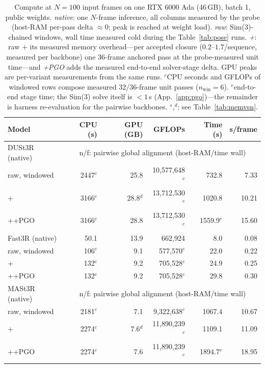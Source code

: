 \begin{table}[h]
\centering\scriptsize
\setlength{\tabcolsep}{3.5pt}
\caption{Compute at $N{=}100$ input frames on one RTX 6000 Ada (46\,GB),
batch 1, public weights. \emph{native}: one $N$-frame inference, all
columns measured by the probe (host-RAM per-pass delta ${\approx}0$;
peak is reached at weight load). \emph{raw}: Sim(3)-chained windows,
wall time measured cold during the Table~\ref{tab:pose} runs.
\emph{+\smr{}}: raw $+$ its measured memory overhead---per accepted
closure ($0.2$--$1.7$/sequence, measured per backbone) one 36-frame
anchored pass at the probe-measured unit time---and \emph{+PGO} adds the
measured end-to-end solver-stage delta. GPU peaks are per-variant
measurements from the same runs. $^{c}$CPU seconds and GFLOPs of
windowed rows compose measured 32/36-frame unit passes
($n_{\mathrm{win}}{=}6$). $^{e}$end-to-end stage time; the Sim(3) solve
itself is ${<}1$\,s (App.~\ref{app:pgo})---the remainder is harness
re-evaluation for the pairwise backbones. $^{s}$,$^{d}$: see
Table~\ref{tab:memvsn}.}
\label{tab:compute}
\begin{tabular}{@{}l rrrrr@{}}
\toprule
Model & CPU (s) & GPU (GB) & GFLOPs & Time (s) & s/frame \\
\midrule
DUSt3R (native) & \multicolumn{5}{c}{n/f: pairwise global alignment (host-RAM/time wall)} \\
\;raw, windowed & 2447$^{c}$ & 25.8 & 10{,}577{,}648$^{c}$ & 732.8 & 7.33 \\
\;+\smr{} & 3166$^{c}$ & 28.8$^{d}$ & 13{,}712{,}530$^{c}$ & 1020.8 & 10.21 \\
\;+\smr{}+PGO & 3166$^{c}$ & 28.8 & 13{,}712{,}530$^{c}$ & 1559.9$^{e}$ & 15.60 \\
\midrule
Fast3R (native) & 50.1 & 13.9 & 662{,}924 & 8.0 & 0.08 \\
\;raw, windowed & 106$^{c}$ & 9.1 & 577{,}570$^{c}$ & 22.0 & 0.22 \\
\;+\smr{} & 132$^{c}$ & 9.2 & 705{,}528$^{c}$ & 24.9 & 0.25 \\
\;+\smr{}+PGO & 132$^{c}$ & 9.2 & 705{,}528$^{c}$ & 29.8 & 0.30 \\
\midrule
MASt3R (native) & \multicolumn{5}{c}{n/f: pairwise global alignment (host-RAM/time wall)} \\
\;raw, windowed & 2181$^{c}$ & 7.1 & 9{,}322{,}638$^{c}$ & 1067.4 & 10.67 \\
\;+\smr{} & 2274$^{c}$ & 7.6$^{d}$ & 11{,}890{,}239$^{c}$ & 1109.1 & 11.09 \\
\;+\smr{}+PGO & 2274$^{c}$ & 7.6 & 11{,}890{,}239$^{c}$ & 1894.7$^{e}$ & 18.95 \\

\end{tabular}
\end{table}
